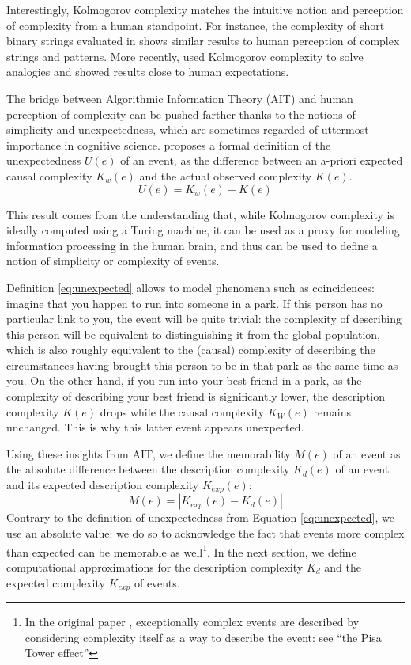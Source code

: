 \documentclass[conference]{IEEEtran}
\begin{document}
Interestingly, Kolmogorov complexity matches the intuitive
notion and perception of complexity from a human standpoint. For instance, the
complexity of short binary strings evaluated in \cite{delahaye_numerical_2012}
shows similar results to human perception of complex strings and patterns. More
recently, \cite{murena_solving_2020} used Kolmogorov complexity to solve
analogies and showed results close to human expectations.

The bridge between Algorithmic Information Theory (AIT) and human perception of
complexity can be pushed farther thanks to the notions of simplicity and unexpectedness,
which are sometimes regarded of uttermost importance in cognitive science\cite
{chater_simplicity_2003}.
\cite{dessalles2011coincidences} proposes a formal definition of the
unexpectedness $U(e)$ of an event, as the difference between an a-priori
expected causal complexity $K_{w}(e)$ and the actual observed complexity $K
  (e)$.
\begin{equation}
\label{eq:unexpected} U(e) = K_{w}(e) - K(e)
\end{equation}

This result comes from the understanding that, while Kolmogorov complexity is
ideally computed using a Turing machine, it can be used as a proxy for modeling
information processing in the human brain, and thus can be used to define a notion of
simplicity or complexity of events.

Definition \ref{eq:unexpected} allows to model phenomena
such as coincidences: imagine that you happen to run into someone in a park.
If this person has no particular link to you, the event will be quite
trivial: the complexity of describing this person will be equivalent to
distinguishing it from the global population, which is also roughly
equivalent to the (causal) complexity of describing the circumstances having brought this person to be in
that park as the same time as you. On the other hand, if you run into your best friend in
a park, as the complexity of describing your best friend is significantly
lower, the description complexity $K(e)$ drops while the causal complexity
$K_W (e)$ remains unchanged. This is why this latter  event appears unexpected.

Using these insights from AIT, we define the memorability $M(e)$ of an event as the absolute difference between the description complexity $K_d(e)$ of an event and its expected description complexity $K_{exp}(e)$:
\begin{equation}
  \label{eq:memorability}
  M(e) = |K_{exp}(e) - K_d(e)|
\end{equation}
Contrary to the definition of unexpectedness from Equation \ref{eq:unexpected}, we use an absolute value: we do so to acknowledge the fact that events more complex than expected can be memorable as well\footnote{In the original paper \cite{dessalles2011coincidences}, exceptionally complex events are described by considering complexity itself as a way to describe the event: see ``the Pisa Tower effect''\cite{dessalles_pisa_nodate}}. In the next section, we define computational approximations for the description complexity $K_d$ and the expected complexity $K_{exp}$ of events.
\end{document}
